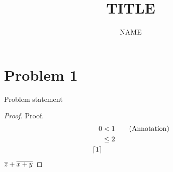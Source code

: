 \documentclass{article}
\title{TITLE}
\author{NAME}
\begin{document}
	\section*{Problem 1}
    \begin{theorem}
        Problem statement
    \end{theorem}
    \begin{proof}
        Proof.
        \begin{align*}
            0 &< 1 \tag{Annotation} \\
            &\leq 2 \\
            \lceil1\rceil
        \end{align*}
        $\overline{z} + \overline{x+y}$
    \end{proof}
\end{document}

